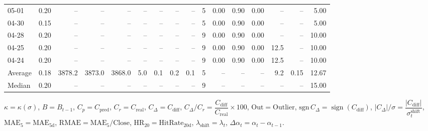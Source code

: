 \begin{threeparttable}
{\begin{tabular}{lrrrrrrrrrrrrrrr}
  05-01 &     0.20 &     -- &     -- &     -- &         -- &             -- &                       -- &                  -- &              5 &       0.00 &      0.90 &           0.00 &               -- &              -- &                   5.00 \\
  04-30 &     0.15 &     -- &     -- &     -- &         -- &             -- &                       -- &                  -- &              5 &       0.00 &      0.90 &           0.00 &               -- &              -- &                   5.00 \\
  04-28 &     0.20 &     -- &     -- &     -- &         -- &             -- &                       -- &                  -- &              9 &       0.00 &      0.90 &           0.00 &               -- &              -- &                  10.00 \\
  04-25 &     0.20 &     -- &     -- &     -- &         -- &             -- &                       -- &                  -- &              9 &       0.00 &      0.90 &           0.00 &             12.5 &              -- &                  10.00 \\
  04-24 &     0.20 &     -- &     -- &     -- &         -- &             -- &                       -- &                  -- &              9 &       0.00 &      0.90 &           0.00 &             12.5 &              -- &                  10.00 \\
Average &     0.18 & 3878.2 & 3873.0 & 3868.0 &        5.0 &            0.1 &                      0.2 &                 0.1 &              5 &         -- &        -- &             -- &              9.2 &            0.15 &                  12.67 \\
 Median &     0.20 &     -- &     -- &     -- &         -- &             -- &                       -- &                  -- &              9 &         -- &        -- &             -- &               -- &              -- &                  15.00 \\
\bottomrule
\end{tabular}
}
\begin{tablenotes}\footnotesize
\item $\kappa=\kappa(\sigma)$, $B=B_{t-1}$, $C_p=C_{\text{pred}}$, $C_r=C_{\text{real}}$, $C_\Delta=C_{\text{diff}}$, $C_\Delta/C_r=\dfrac{C_{\text{diff}}}{C_{\text{real}}}\times100$, $\mathrm{Out}=\text{Outlier}$, $\mathrm{sgn}\,C_\Delta=\operatorname{sign}(C_{\text{diff}})$, $|C_\Delta|/\sigma=\dfrac{|C_{\text{diff}}|}{\sigma_t^{\text{shift}}}$, $\mathrm{MAE}_5=\mathrm{MAE}_{5\text{d}}$, $\mathrm{RMAE}= \mathrm{MAE}_5 / \text{Close}$, $\mathrm{HR}_{20}=\mathrm{HitRate}_{20\text{d}}$, 
$\lambda_{\text{shift}}=\lambda_t$, 
$\Delta\alpha_t=\alpha_t-\alpha_{t-1}$.
\end{tablenotes}
\end{threeparttable}
\endgroup

